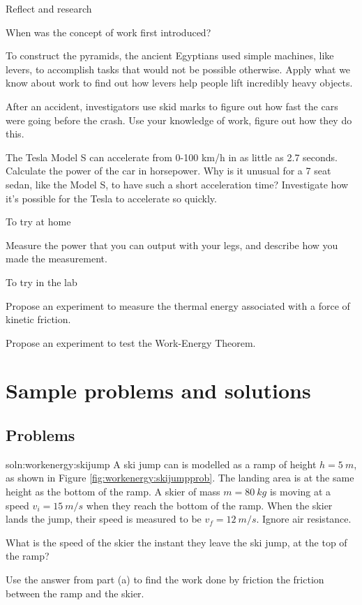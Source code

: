 \begin{chapteractivity}{Reflect and research}
{
\item When was the concept of work first introduced?
\item To construct the pyramids, the ancient Egyptians used simple machines, like levers, to accomplish tasks that would not be possible otherwise. Apply what we know about work to find out how levers help people lift incredibly heavy objects. 
\item After an accident, investigators use skid marks to figure out how fast the cars were going before the crash. Use your knowledge of work, figure out how they do this.
\item The Tesla Model S can accelerate from 0-100 \si{km/h} in as little as 2.7 seconds. Calculate the power of the car in horsepower. Why is it unusual for a 7 seat sedan, like the Model S, to have such a short acceleration time? Investigate how it's possible for the Tesla to accelerate so quickly. 
}
\end{chapteractivity}

\begin{chapteractivity}{To try at home}
{
\item Measure the power that you can output with your legs, and describe how you made the measurement.
}
\end{chapteractivity}

\begin{chapteractivity}{To try in the lab}
{
\item Propose an experiment to measure the thermal energy associated with a force of kinetic friction. 
\item Propose an experiment to test the Work-Energy Theorem.
}
\end{chapteractivity}
\newpage
\section{Sample problems and solutions}
\subsection{Problems}
\begin{problemParts}{soln:workenergy:skijump}{\label{prob:workenergy:skijump} A ski jump can is modelled as a ramp of height $h=\SI{5}{m}$, as shown in Figure \ref{fig:workenergy:skijumpprob}. The landing area is at the same height as the bottom of the ramp. A skier of mass $m=\SI{80}{kg}$ is moving at a speed $v_i=\SI{15}{m/s}$ when they reach the bottom of the ramp. When the skier lands the jump, their speed is measured to be $v_f=\SI{12}{m/s}$. Ignore air resistance. 
}
\item What is the speed of the skier the instant they leave the ski jump, at the top of the ramp?
\item Use the answer from part (a) to find the work done by friction the friction between the ramp and the skier.
\end{problemParts}


